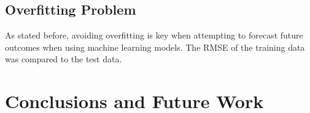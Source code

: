 \documentclass[a4paper,11pt,twoside]{article}
\begin{document}
\subsection{Overfitting Problem}
As stated before, avoiding overfitting is key when attempting to forecast future outcomes when using machine learning models. The RMSE of the training data was compared to the test data.


\begin{table}[h!]
\captionsetup{justification=centering}
\begin{center}
\end{center}
\caption{Comparing the RMSE of the training data and the testing data for every model}
\end{table}
\vspace{5mm}

\newpage
\section{Conclusions and Future Work}
\end{document}
